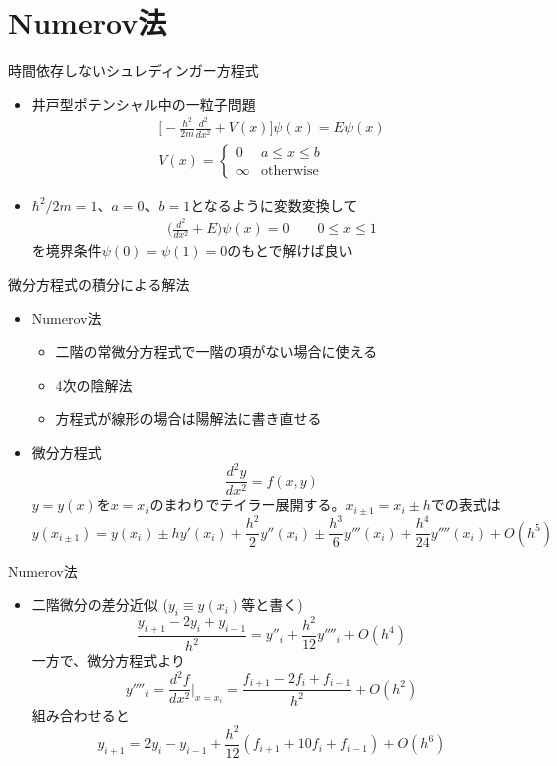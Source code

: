 \section{Numerov法}

\begin{frame}[t,fragile]{時間依存しないシュレディンガー方程式}
  \begin{itemize}
    \setlength{\itemsep}{1em}
  \item 井戸型ポテンシャル中の一粒子問題
    \begin{align*}
      \big[ -\frac{\hbar^2}{2m}\frac{d^2}{dx^2} + V(x) \big] \psi(x) = E \psi(x) \\
      V(x) = \begin{cases}
        0 & \text{$a \le x \le b$} \\ \infty & \text{otherwise}
      \end{cases}
    \end{align*}
  \item $\hbar^2/2m = 1$、$a=0$、$b=1$となるように変数変換して
    \begin{align*}
      \big( \frac{d^2}{dx^2} + E \big) \psi(x) = 0 \qquad 0 \le x \le 1
    \end{align*}
    を境界条件$\psi(0) = \psi(1) = 0$のもとで解けば良い
  \end{itemize}
\end{frame}

\begin{frame}[t,fragile]{微分方程式の積分による解法}
  \begin{itemize}
    \setlength{\itemsep}{1em}
  \item Numerov法
    \begin{itemize}
    \item 二階の常微分方程式で一階の項がない場合に使える
    \item 4次の陰解法
    \item 方程式が線形の場合は陽解法に書き直せる
    \end{itemize}
  \item 微分方程式
    \[
    \frac{d^2y}{dx^2} = f(x,y)
    \]
  $y=y(x)$を$x=x_i$のまわりでテイラー展開する。$x_{i \pm 1} = x_i \pm h$での表式は
      \[
      y(x_{i \pm 1}) = y(x_i) \pm h y'(x_i) + \frac{h^2}{2} y''(x_i) \pm \frac{h^3}{6} y'''(x_i) + \frac{h^4}{24} y''''(x_i)  + O(h^5)
      \]
  \end{itemize}
\end{frame}

\begin{frame}[t,fragile]{Numerov法}
  \begin{itemize}
    \setlength{\itemsep}{1em}
  \item 二階微分の差分近似 ($y_i \equiv y(x_i)$等と書く)
    \[
    \frac{y_{i+1} - 2 y_i + y_{i-1}}{h^2} = y''_{i} + \frac{h^2}{12} y''''_{i} + O(h^4)
    \]
  一方で、微分方程式より
    \[
    y''''_i = \frac{d^2f}{dx^2}\Big|_{x=x_i} = \frac{f_{i+1}-2f_i+f_{i-1}}{h^2} + O(h^2)
    \]
    組み合わせると
    \[
    y_{i+1} = 2y_i - y_{i-1} + \frac{h^2}{12} (f_{i+1} + 10f_{i} + f_{i-1}) + O(h^6)
    \]
  \end{itemize}
\end{frame}

